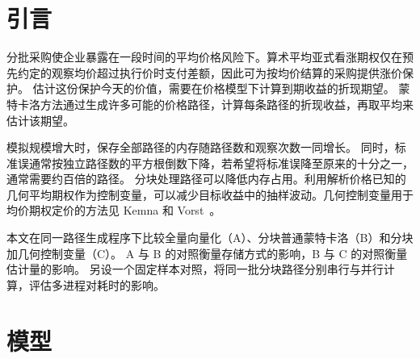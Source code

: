 \begin{abstract}
算术平均亚式期权的到期收益取决于多个观察日的标的价格。
用蒙特卡洛方法定价时，路径存储限制了可模拟的样本规模，抽样误差则限制了估价精度。
本文比较全量向量化、分块模拟和分块加几何控制变量三种方法，并在相同路径上比较串行与多进程执行。
在一百万条正式路径下，分块将峰值常驻内存从 \PaperMemoryA{} MiB 降至 \PaperMemoryB{} MiB。
加入几何控制变量后，标准误中位数降至普通分块的约 \(1/\PaperSERatio\)，单次核心耗时由 \PaperTimeB{} 秒增至 \PaperTimeC{} 秒，后者包含拟合系数的预备计算。
在单独的固定路径对照中，六进程相对于单核串行的实测加速比为 \(\ParallelSpeedup\times\)，两种执行方式得到相同的价格估计与标准误。
改变执行价、波动率和观察次数时，几何控制变量在各组实验中均降低了标准误。
\end{abstract}

\section{引言}
分批采购使企业暴露在一段时间的平均价格风险下。算术平均亚式看涨期权仅在预先约定的观察均价超过执行价时支付差额，因此可为按均价结算的采购提供涨价保护。
估计这份保护今天的价值，需要在价格模型下计算到期收益的折现期望。
蒙特卡洛方法通过生成许多可能的价格路径，计算每条路径的折现收益，再取平均来估计该期望。

模拟规模增大时，保存全部路径的内存随路径数和观察次数一同增长。
同时，标准误通常按独立路径数的平方根倒数下降，若希望将标准误降至原来的十分之一，通常需要约百倍的路径。
分块处理路径可以降低内存占用。利用解析价格已知的几何平均期权作为控制变量，可以减少目标收益中的抽样波动。几何控制变量用于均价期权定价的方法见 Kemna 和 Vorst~\cite{kemna}。

本文在同一路径生成程序下比较全量向量化（A）、分块普通蒙特卡洛（B）和分块加几何控制变量（C）。
A 与 B 的对照衡量存储方式的影响，B 与 C 的对照衡量估计量的影响。
另设一个固定样本对照，将同一批分块路径分别串行与并行计算，评估多进程对耗时的影响。

\section{模型}
